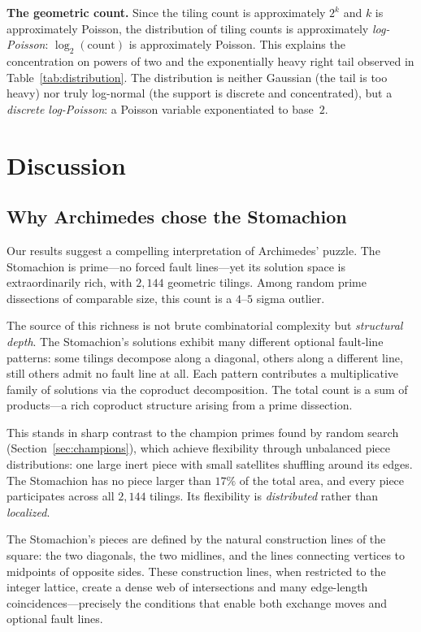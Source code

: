 \documentclass[12pt]{article}
\theoremstyle{definition}
\theoremstyle{remark}
\begin{document}
\textbf{The geometric count.}
Since the tiling count is approximately $2^k$ and $k$ is approximately
Poisson, the distribution of tiling counts is approximately
\emph{log-Poisson}: $\log_2(\text{count})$ is approximately Poisson.
This explains the concentration on powers of two and the exponentially
heavy right tail observed in Table~\ref{tab:distribution}. The
distribution is neither Gaussian (the tail is too heavy) nor truly
log-normal (the support is discrete and concentrated), but a
\emph{discrete log-Poisson}: a Poisson variable exponentiated to
base~$2$.

\section{Discussion}
\label{sec:discussion}

\subsection{Why Archimedes chose the Stomachion}

Our results suggest a compelling interpretation of Archimedes' puzzle.
The Stomachion is prime---no forced fault lines---yet its solution space
is extraordinarily rich, with $2{,}144$ geometric tilings. Among
random prime dissections of comparable size, this count is a
$4$--$5$ sigma outlier.

The source of this richness is not brute combinatorial complexity but
\emph{structural depth}. The Stomachion's solutions exhibit many
different optional fault-line patterns: some tilings decompose along
a diagonal, others along a different line, still others admit no fault
line at all. Each pattern contributes a multiplicative family of
solutions via the coproduct decomposition. The total count is a sum
of products---a rich coproduct structure arising from a prime dissection.

This stands in sharp contrast to the champion primes found by random
search (Section~\ref{sec:champions}), which achieve flexibility through
unbalanced piece distributions: one large inert piece with small
satellites shuffling around its edges. The Stomachion has no piece
larger than $17\%$ of the total area, and every piece participates
across all $2{,}144$ tilings. Its flexibility is \emph{distributed}
rather than \emph{localized}.

The Stomachion's pieces are defined by the natural construction lines of
the square: the two diagonals, the two midlines, and the lines
connecting vertices to midpoints of opposite sides. These construction
lines, when restricted to the integer lattice, create a dense web of
intersections and many edge-length coincidences---precisely the
conditions that enable both exchange moves and optional fault lines.
\end{document}
